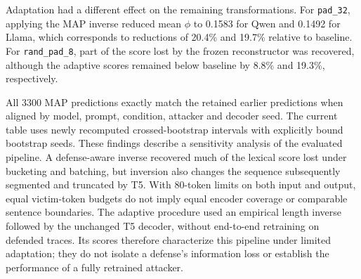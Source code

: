 \documentclass[electronics,article,submit,pdftex,moreauthors]{Definitions/mdpi}
\begin{document}
Adaptation had a different effect on the remaining transformations. For \texttt{pad\_32}, applying the MAP inverse reduced mean $\phi$ to 0.1583 for Qwen and 0.1492 for Llama, which corresponds to reductions of 20.4\% and 19.7\% relative to baseline. For \texttt{rand\_pad\_8}, part of the score lost by the frozen reconstructor was recovered, although the adaptive scores remained below baseline by 8.8\% and 19.3\%, respectively.

All 3300 MAP predictions exactly match the retained earlier predictions when aligned by model, prompt, condition, attacker and decoder seed. The current table uses newly recomputed crossed-bootstrap intervals with explicitly bound bootstrap seeds. These findings describe a sensitivity analysis of the evaluated pipeline. A defense-aware inverse recovered much of the lexical score lost under bucketing and batching, but inversion also changes the sequence subsequently segmented and truncated by T5. With 80-token limits on both input and output, equal victim-token budgets do not imply equal encoder coverage or comparable sentence boundaries. The adaptive procedure used an empirical length inverse followed by the unchanged T5 decoder, without end-to-end retraining on defended traces. Its scores therefore characterize this pipeline under limited adaptation; they do not isolate a defense's information loss or establish the performance of a fully retrained attacker.
\end{document}
